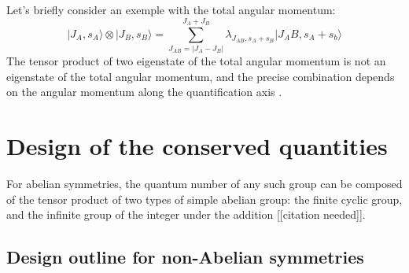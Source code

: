 \documentclass[15pt]{book}
\newcommand{\ket}[1]{| #1 \rangle}
\begin{document}
Let's briefly consider an exemple with the total angular momentum:
\begin{equation}
    \ket{J_A,s_A} \otimes \ket{J_B,s_B} = \sum_{J_{AB} = |J_A - J_B|}^{J_A + J_B} \lambda_{J_{AB},s_{A}+s_B} \ket{J_AB,s_A+s_b}
\end{equation}
The tensor product of two eigenstate of the total angular momentum is not an eigenstate of the total angular momentum, and the precise combination depends on the angular momentum along the quantification axis .
\section{Design of the conserved quantities}

For abelian symmetries, the quantum number of any such group can be composed of the tensor product of two types of simple abelian group: the finite cyclic group, and the infinite group of the integer under the addition [[citation needed]].

\subsection{Design outline for non-Abelian symmetries}
\end{document}
